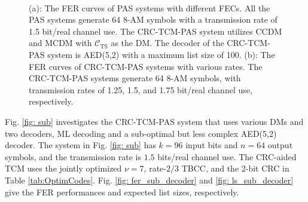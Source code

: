 \documentclass [PhD] {uclathes}
\begin{document}
\begin{figure}[htp]
    \centering
    \\
    \caption{(a): The FER curves of PAS systems with different FECs. All the PAS systems generate 64 8-AM symbols with a transmission rate of 1.5 bit/real channel use.  The CRC-TCM-PAS system utilizes CCDM and MCDM with $\mathcal{C}_{\mathrm{TS}}$ as the DM. The decoder of the CRC-TCM-PAS system is AED(5,2) with a maximum list size of 100. (b): The FER curves of CRC-TCM-PAS systems with various rates. The CRC-TCM-PAS systems generate 64 8-AM symbols, with  transmission rates of 1.25, 1.5, and 1.75 bit/real channel use, respectively.
    }
\end{figure}

Fig. \ref{fig: sub} investigates the CRC-TCM-PAS system that uses various DMs and two decoders, ML decoding and a sub-optimal but less complex AED(5,2) decoder. The system in Fig. \ref{fig: sub} has $k=96$ input bits and $n=64$ output symbols, and the transmission rate is $1.5$ bits/real channel use. The CRC-aided TCM uses the jointly optimized $\nu=7$, rate-$2/3$ TBCC, and the 2-bit CRC in Table \ref{tab:OptimCodes}. Fig. \ref{fig: fer_sub_decoder} and \ref{fig: ls_sub_decoder} give the FER performances and expected list sizes, respectively. 
\end{document}

